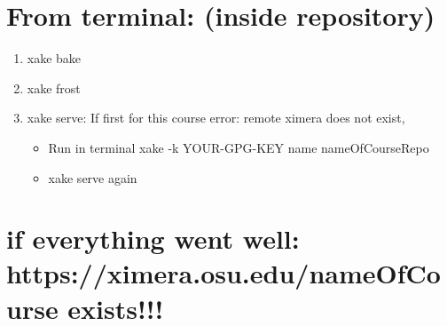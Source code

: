 \documentclass{ximera}
\begin{document}
\section{From terminal: (inside repository)}
\begin{enumerate}
\item xake bake
\item	xake frost
\item	xake serve: If first for this course error: remote ximera does not exist,  
\begin{itemize}
\item Run in terminal xake -k YOUR-GPG-KEY name nameOfCourseRepo
\item xake serve again
\end{itemize}
\end{enumerate}

\section{if everything went well: https://ximera.osu.edu/nameOfCourse exists!!!}
\end{document}
